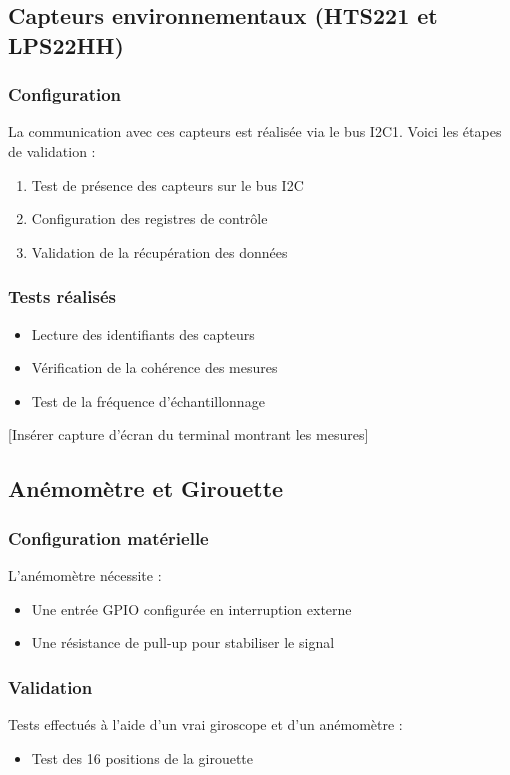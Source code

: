 \documentclass[12pt]{article}
\begin{document}
\subsection{Capteurs environnementaux (HTS221 et LPS22HH)}
\subsubsection{Configuration}
La communication avec ces capteurs est réalisée via le bus I2C1. Voici les étapes de validation :
\begin{enumerate}
    \item Test de présence des capteurs sur le bus I2C
    \item Configuration des registres de contrôle
    \item Validation de la récupération des données
\end{enumerate}

\subsubsection{Tests réalisés}
\begin{itemize}
    \item Lecture des identifiants des capteurs
    \item Vérification de la cohérence des mesures
    \item Test de la fréquence d'échantillonnage
\end{itemize}

[Insérer capture d'écran du terminal montrant les mesures]

\subsection{Anémomètre et Girouette}
\subsubsection{Configuration matérielle}
L'anémomètre nécessite :
\begin{itemize}
    \item Une entrée GPIO configurée en interruption externe
    \item Une résistance de pull-up pour stabiliser le signal
\end{itemize}

\subsubsection{Validation}
Tests effectués à l'aide d'un vrai giroscope et d'un anémomètre :
\begin{itemize}
    \item Test des 16 positions de la girouette
\end{itemize}
\end{document}
